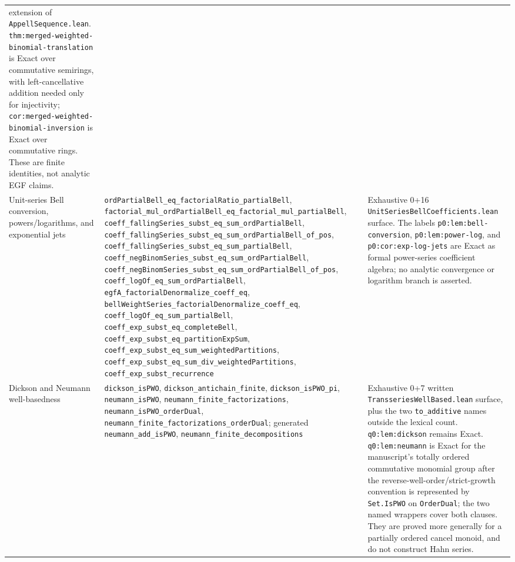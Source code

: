 \documentclass[11pt,oneside]{article}
\theoremstyle{definition}
\theoremstyle{remark}
\begin{document}
\begin{longtable}{@{}>{\raggedright\arraybackslash}p{} >{\raggedright\arraybackslash}p{} >{\raggedright\arraybackslash}p{}@{}}
extension of \nolinkurl{AppellSequence.lean}.
\nolinkurl{thm:merged-weighted-binomial-translation} is Exact over
commutative semirings, with left-cancellative addition needed only for
injectivity; \nolinkurl{cor:merged-weighted-binomial-inversion} is Exact over
commutative rings.  These are finite identities, not analytic EGF claims. \\
Unit-series Bell conversion, powers/logarithms, and exponential jets &
\nolinkurl{ordPartialBell_eq_factorialRatio_partialBell},
\nolinkurl{factorial_mul_ordPartialBell_eq_factorial_mul_partialBell},
\nolinkurl{coeff_fallingSeries_subst_eq_sum_ordPartialBell},
\nolinkurl{coeff_fallingSeries_subst_eq_sum_ordPartialBell_of_pos},
\nolinkurl{coeff_fallingSeries_subst_eq_sum_partialBell},
\nolinkurl{coeff_negBinomSeries_subst_eq_sum_ordPartialBell},
\nolinkurl{coeff_negBinomSeries_subst_eq_sum_ordPartialBell_of_pos},
\nolinkurl{coeff_logOf_eq_sum_ordPartialBell},
\nolinkurl{egfA_factorialDenormalize_coeff_eq},
\nolinkurl{bellWeightSeries_factorialDenormalize_coeff_eq},
\nolinkurl{coeff_logOf_eq_sum_partialBell},
\nolinkurl{coeff_exp_subst_eq_completeBell},
\nolinkurl{coeff_exp_subst_eq_partitionExpSum},
\nolinkurl{coeff_exp_subst_eq_sum_weightedPartitions},
\nolinkurl{coeff_exp_subst_eq_sum_div_weightedPartitions},
\nolinkurl{coeff_exp_subst_recurrence} & Exhaustive 0+16
\nolinkurl{UnitSeriesBellCoefficients.lean} surface.  The labels
\nolinkurl{p0:lem:bell-conversion}, \nolinkurl{p0:lem:power-log}, and
\nolinkurl{p0:cor:exp-log-jets} are Exact as formal power-series coefficient
algebra; no analytic convergence or logarithm branch is asserted. \\
Dickson and Neumann well-basedness &
\nolinkurl{dickson_isPWO}, \nolinkurl{dickson_antichain_finite},
\nolinkurl{dickson_isPWO_pi}, \nolinkurl{neumann_isPWO},
\nolinkurl{neumann_finite_factorizations},
\nolinkurl{neumann_isPWO_orderDual},
\nolinkurl{neumann_finite_factorizations_orderDual}; generated
\nolinkurl{neumann_add_isPWO}, \nolinkurl{neumann_finite_decompositions} &
Exhaustive 0+7 written \nolinkurl{TransseriesWellBased.lean} surface, plus the
two \nolinkurl{to_additive} names outside the lexical count.
\nolinkurl{q0:lem:dickson} remains Exact.  \nolinkurl{q0:lem:neumann} is Exact
for the manuscript's totally ordered commutative monomial group after the
reverse-well-order/strict-growth convention is represented by
\nolinkurl{Set.IsPWO} on \nolinkurl{OrderDual}; the two named wrappers cover
both clauses.  They are proved more generally for a partially ordered cancel
monoid, and do not construct Hahn series. \\

\end{longtable}
\end{document}
